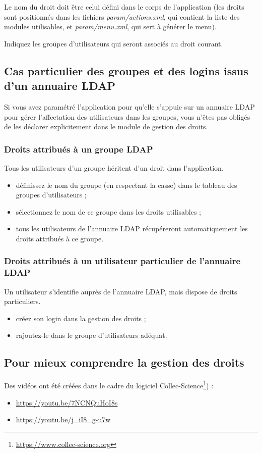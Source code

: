 Le nom du droit doit être celui défini dans le corps de l'application (les droits sont positionnés dans les fichiers \textit{param/actions.xml}, qui contient la liste des modules utilisables, et \textit{param/menu.xml}, qui sert à générer le menu).

Indiquez les groupes d'utilisateurs qui seront associés au droit courant.

\subsection{Cas particulier des groupes et des logins issus d'un annuaire LDAP}

Si vous avez paramétré l'application pour qu'elle s'appuie sur un annuaire LDAP pour gérer l'affectation des utilisateurs dans les groupes, vous n'êtes pas obligés de les déclarer explicitement dans le module de gestion des droits.

\subsubsection{Droits attribués à un groupe LDAP}

Tous les utilisateurs d'un groupe héritent d'un droit dans l'application.

\begin{itemize}
\item définissez le nom du groupe (en respectant la casse) dans le tableau des groupes d'utilisateurs ;
\item sélectionnez le nom de ce groupe dans les droits utilisables ;
\item tous les utilisateurs de l'annuaire LDAP récupéreront automatiquement les droits attribués à ce groupe.
\end{itemize}

\subsubsection{Droits attribués à un utilisateur particulier de l'annuaire LDAP}

Un utilisateur s'identifie auprès de l'annuaire LDAP, mais dispose de droits particuliers.

\begin{itemize}
\item créez son login dans la gestion des droits ;
\item rajoutez-le dans le groupe d'utilisateurs adéquat.
\end{itemize}

\subsection{Pour mieux comprendre la gestion des droits}

Des vidéos ont été créées dans le cadre du logiciel Collec-Science\footnote{\href{https://www.collec-science.org}{https://www.collec-science.org}}) :
\begin{itemize}
\item \href{https://youtu.be/7NCNQuHoI8s}{https://youtu.be/7NCNQuHoI8s}
\item \href{https://youtu.be/j_iI8_g-u7w}{https://youtu.be/j\_iI8\_g-u7w}
\end{itemize}
